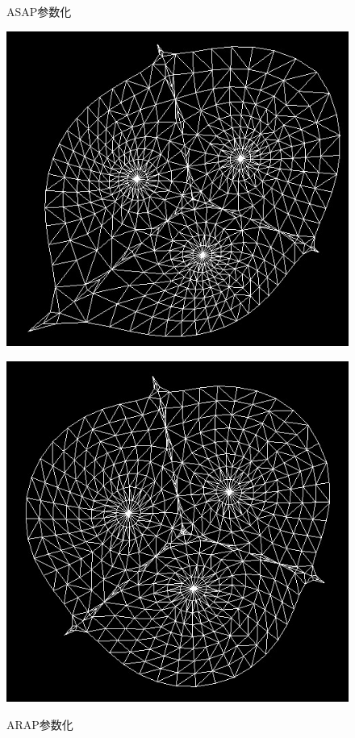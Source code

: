 \documentclass{article}
\begin{document}
\begin{figure}[htbp]
\begin{minipage}{0.24\linewidth}
			\label{chutian2}%
		\end{minipage}
		\begin{minipage}{0.24\linewidth}
			\centering
			\caption{ASAP参数化}
			\includegraphics[width=1\linewidth]{balls_asap.JPG}
			\label{chutian2}%
		\end{minipage}
		\begin{minipage}{0.24\linewidth}
			\centering
			\caption{ARAP参数化}
			\includegraphics[width=1\linewidth]{balls_arap.JPG}
			\label{chutian2}%
		\end{minipage}
	\end{figure}
\end{document}
